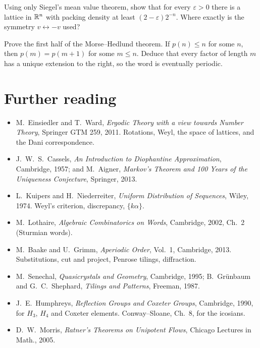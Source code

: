 \begin{exercise}
Using only Siegel's mean value theorem, show that for every $\varepsilon>0$ there is a lattice in $\mathbb{R}^n$
with packing density at least $(2-\varepsilon)2^{-n}$. Where exactly is the symmetry $v\leftrightarrow-v$
used?
\end{exercise}

\begin{exercise}\label{ERG:ex:mh}
Prove the first half of the Morse--Hedlund theorem. If $p(n)\le n$ for some $n$, then $p(m)=p(m+1)$ for
some $m\le n$. Deduce that every factor of length $m$ has a unique extension to the right, so the word is
eventually periodic.
\end{exercise}

\section*{Further reading}
\begin{itemize}[nosep]
\item M.~Einsiedler and T.~Ward, \emph{Ergodic Theory with a view towards Number Theory}, Springer GTM 259,
  2011. Rotations, Weyl, the space of lattices, and the Dani correspondence.
\item J.~W.~S.~Cassels, \emph{An Introduction to Diophantine Approximation}, Cambridge, 1957; and
  M.~Aigner, \emph{Markov's Theorem and 100 Years of the Uniqueness Conjecture}, Springer, 2013.
\item L.~Kuipers and H.~Niederreiter, \emph{Uniform Distribution of Sequences}, Wiley, 1974. Weyl's
  criterion, discrepancy, $\{k\alpha\}$.
\item M.~Lothaire, \emph{Algebraic Combinatorics on Words}, Cambridge, 2002, Ch.~2 (Sturmian words).
\item M.~Baake and U.~Grimm, \emph{Aperiodic Order}, Vol.~1, Cambridge, 2013. Substitutions, cut and
  project, Penrose tilings, diffraction.
\item M.~Senechal, \emph{Quasicrystals and Geometry}, Cambridge, 1995; B.~Gr\"unbaum and G.~C.~Shephard,
  \emph{Tilings and Patterns}, Freeman, 1987.
\item J.~E.~Humphreys, \emph{Reflection Groups and Coxeter Groups}, Cambridge, 1990, for $H_3$, $H_4$ and
  Coxeter elements. Conway--Sloane, Ch.~8, for the icosians.
\item D.~W.~Morris, \emph{Ratner's Theorems on Unipotent Flows}, Chicago Lectures in Math., 2005.
\end{itemize}
